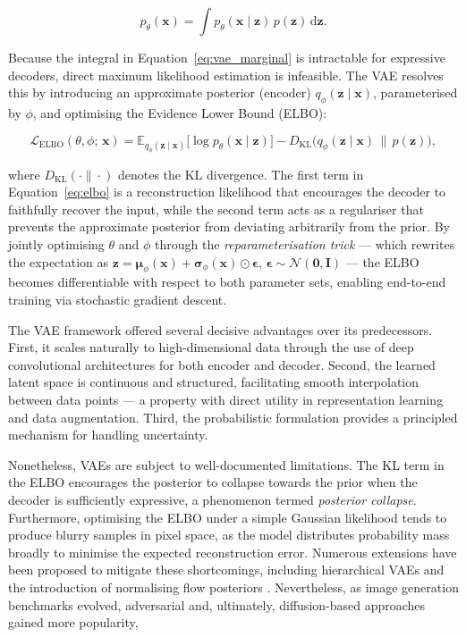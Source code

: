 \begin{equation}
    p_\theta(\bm{x}) = \int p_\theta(\bm{x} \mid \bm{z})\, p(\bm{z})\, \mathrm{d}\bm{z}.
    \label{eq:vae_marginal}
\end{equation}

Because the integral in Equation~\ref{eq:vae_marginal} is intractable for
expressive decoders, direct maximum likelihood estimation is infeasible. The
VAE resolves this by introducing an approximate posterior (encoder)
$q_\phi(\mathbf{z} \mid \mathbf{x})$, parameterised by $\phi$, and optimising
the Evidence Lower Bound (ELBO):

\begin{equation}
    \mathcal{L}_{\text{ELBO}}(\theta, \phi;\, \mathbf{x}) =
    \mathbb{E}_{q_\phi(\mathbf{z} \mid \mathbf{x})}
    \bigl[\log p_\theta(\mathbf{x} \mid \mathbf{z})\bigr]
    - D_{\text{KL}}\bigl(q_\phi(\mathbf{z} \mid \mathbf{x}) \,\|\, p(\mathbf{z})\bigr),
    \label{eq:elbo}
\end{equation}

\noindent where $D_{\text{KL}}(\cdot \| \cdot)$ denotes the KL divergence. The
first term in Equation~\ref{eq:elbo} is a reconstruction likelihood that
encourages the decoder to faithfully recover the input, while the second term
acts as a regulariser that prevents the approximate posterior from deviating
arbitrarily from the prior. By jointly optimising $\theta$ and $\phi$ through
the \emph{reparameterisation trick} — which rewrites the expectation as
$\mathbf{z} = \boldsymbol{\mu}_\phi(\mathbf{x}) +
\boldsymbol{\sigma}_\phi(\mathbf{x}) \odot \boldsymbol{\epsilon}$,
$\boldsymbol{\epsilon} \sim \mathcal{N}(\mathbf{0}, \mathbf{I})$ — the ELBO
becomes differentiable with respect to both parameter sets, enabling
end-to-end training via stochastic gradient descent.

The VAE framework offered several decisive advantages over its predecessors.
First, it scales naturally to high-dimensional data through the use of deep
convolutional architectures for both encoder and decoder. Second, the learned
latent space is continuous and structured, facilitating smooth interpolation
between data points — a property with direct utility in representation learning
and data augmentation. Third, the probabilistic
formulation provides a principled mechanism for handling uncertainty.

Nonetheless, VAEs are subject to well-documented limitations. The KL term in
the ELBO encourages the posterior to collapse towards the prior when the
decoder is sufficiently expressive, a phenomenon termed \emph{posterior
collapse}. Furthermore, optimising the ELBO
under a simple Gaussian likelihood tends to produce blurry samples in
pixel space, as the model distributes probability mass broadly to minimise
the expected reconstruction error. Numerous
extensions have been proposed to mitigate these shortcomings, including
hierarchical VAEs and the introduction
of normalising flow posteriors \cite{rezende2015variational}. Nevertheless,
as image generation benchmarks evolved, adversarial and, ultimately, diffusion-based approaches gained more popularity,

